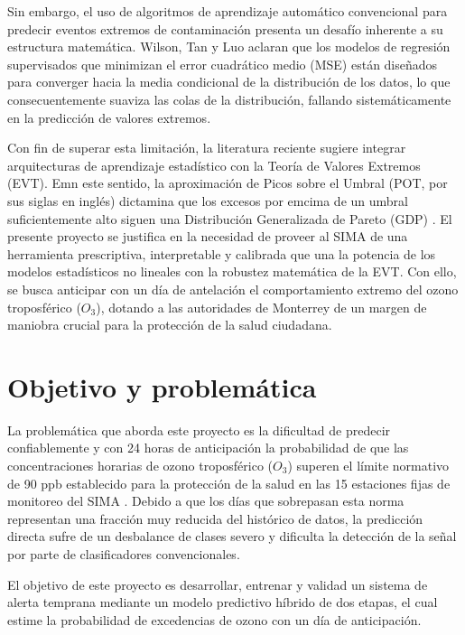 \documentclass[11pt]{article}
\begin{document}
Sin embargo, el uso de algoritmos de aprendizaje automático convencional para predecir eventos extremos de contaminación presenta un desafío inherente a su estructura matemática. Wilson, Tan y Luo \cite{wilson2022deepgpd} aclaran que los modelos de regresión supervisados que minimizan el error cuadrático medio (MSE) están diseñados para converger hacia la media condicional de la distribución de los datos, lo que consecuentemente suaviza las colas de la distribución, fallando sistemáticamente en la predicción de valores extremos. 

Con fin de superar esta limitación, la literatura reciente sugiere integrar arquitecturas de aprendizaje estadístico con la Teoría de Valores Extremos (EVT). Emn este sentido, la aproximación de Picos sobre el Umbral (POT, por sus siglas en inglés) dictamina que los excesos por emcima de un umbral suficientemente alto siguen una Distribución Generalizada de Pareto (GDP) \cite{coles2001}. El presente proyecto se justifica en la necesidad de proveer al SIMA de una herramienta prescriptiva, interpretable y calibrada que una la potencia de los modelos estadísticos no lineales con la robustez matemática de la EVT. Con ello, se busca anticipar con un día de antelación el comportamiento extremo del ozono troposférico ($O_3$), dotando a las autoridades de Monterrey de un margen de maniobra crucial para la protección de la salud ciudadana.


\section{Objetivo y problemática}

La problemática que aborda este proyecto es la dificultad de predecir confiablemente y con 24 horas de anticipación la probabilidad de que las concentraciones horarias de ozono troposférico ($O_3$) superen el límite normativo de 90 ppb establecido para la protección de la salud \cite{ssa2021b} en las 15 estaciones fijas de monitoreo del SIMA \cite{simapresentacion}. Debido a que los días que sobrepasan esta norma representan una fracción muy reducida del histórico de datos, la predicción directa sufre de un desbalance de clases severo y dificulta la detección de la señal por parte de clasificadores convencionales.

El objetivo de este proyecto es desarrollar, entrenar y validad un sistema de alerta temprana mediante un modelo predictivo híbrido de dos etapas, el cual estime la probabilidad de excedencias de ozono con un día de anticipación. 
\end{document}
